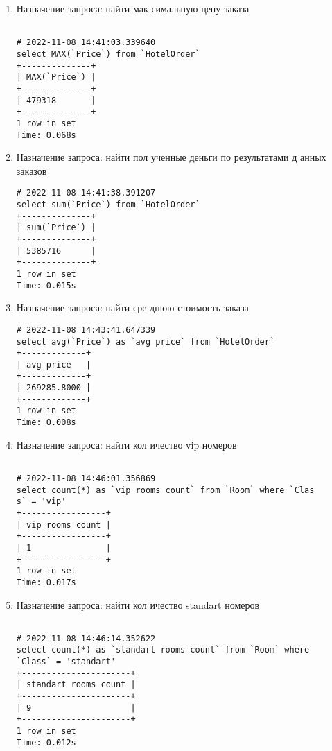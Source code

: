 \begin{enumerate}
\item Назначение запроса: найти мак
симальную цену заказа
\begin{verbatim}

# 2022-11-08 14:41:03.339640
select MAX(`Price`) from `HotelOrder`
+--------------+
| MAX(`Price`) |
+--------------+
| 479318       |
+--------------+
1 row in set
Time: 0.068s

\end{verbatim}

\item Назначение запроса: найти пол
ученные деньги по результатами д
анных заказов

\begin{verbatim}
# 2022-11-08 14:41:38.391207
select sum(`Price`) from `HotelOrder`
+--------------+
| sum(`Price`) |
+--------------+
| 5385716      |
+--------------+
1 row in set
Time: 0.015s

\end{verbatim}

\item Назначение запроса: найти сре
днюю стоимость заказа

\begin{verbatim}
# 2022-11-08 14:43:41.647339
select avg(`Price`) as `avg price` from `HotelOrder`
+-------------+
| avg price   |
+-------------+
| 269285.8000 |
+-------------+
1 row in set
Time: 0.008s
\end{verbatim}

\item Назначение запроса: найти кол
ичество vip номеров

\begin{verbatim}

# 2022-11-08 14:46:01.356869
select count(*) as `vip rooms count` from `Room` where `Clas
s` = 'vip'
+-----------------+
| vip rooms count |
+-----------------+
| 1               |
+-----------------+
1 row in set
Time: 0.017s
\end{verbatim}

\item Назначение запроса: найти кол
ичество standart номеров

\begin{verbatim}

# 2022-11-08 14:46:14.352622
select count(*) as `standart rooms count` from `Room` where 
`Class` = 'standart'
+----------------------+
| standart rooms count |
+----------------------+
| 9                    |
+----------------------+
1 row in set
Time: 0.012s
\end{verbatim}

\end{enumerate}

